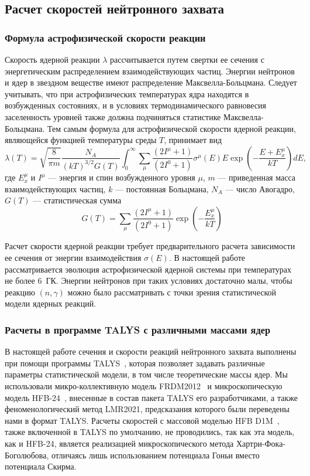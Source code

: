 \subsection{Расчет скоростей нейтронного захвата}
\subsubsection{Формула астрофизической скорости реакции}
Скорость ядерной реакции $\lambda$ рассчитывается путем свертки ее сечения с энергетическим распределением взаимодействующих частиц. Энергии нейтронов и ядер в звездном веществе имеют распределение Максвелла-Больцмана. Следует учитывать, что при астрофизических температурах ядра находятся в возбужденных состояниях, и в условиях термодинамического равновесия заселенность уровней также должна подчиняться статистике Максвелла-Больцмана. Тем самым формула для астрофизической скорости ядерной реакции, являющейся функцией температуры среды $T$, принимает вид
\begin{equation}
\displaystyle
\lambda(T) = \sqrt{\frac{8}{\pi m}} \frac{N_A}{(k T)^{3/2} G(T)} \int_0^\infty \sum_\mu \frac{(2 I^\mu + 1)}{(2 I^0 + 1)} \sigma^\mu(E) E \exp \left( - \frac{E + E_x^\mu}{kT} \right) dE,
\end{equation}
где $E^\mu_x$ и $I^\mu$ --- энергия и спин возбужденного уровня $\mu$, $m$ --- приведенная масса взаимодействующих частиц, $k$ --- постоянная Больцмана, $N_A$ --- число Авогадро, $G(T)$ --- статистическая сумма
\begin{equation}
    \displaystyle
    G(T) = \sum_\mu \frac{(2 I^\mu + 1)}{(2 I^0 + 1)} \exp \left( - \frac{E_x^\mu}{kT} \right)
\end{equation}

Расчет скорости ядерной реакции требует предварительного расчета зависимости ее сечения от энергии взаимодействия $\sigma(E)$. В настоящей работе рассматривается эволюция астрофизической ядерной системы при температурах не более $6$~ГК. Энергии нейтронов при таких условиях достаточно малы, чтобы реакцию $(n,\gamma)$ можно было рассматривать с точки зрения статистической модели ядерных реакций. 

\subsubsection{Расчеты в программе TALYS с различными массами ядер}
В настоящей работе сечения и скорости реакций нейтронного захвата выполнены при помощи программы TALYS~\cite{koning2019}, которая позволяет задавать различные параметры статистической модели, в том числе теоретические массы ядер. Мы использовали микро-коллективную модель FRDM2012~\cite{moller2016} и микроскопическую модель HFB-24~\cite{goriely2013}, внесенные в состав пакета TALYS его разработчиками, а также феноменологический метод LMR2021, предсказания которого были переведены нами в формат TALYS. Расчеты скоростей с массовой моделью HFB D1M~\cite{goriely2009}, также включенной в TALYS по умолчанию, не проводились, так как эта модель, как и HFB-24, является реализацией микроскопического метода Хартри-Фока-Боголюбова, отличаясь лишь использованием потенциала Гоньи вместо потенциала Скирма. 

